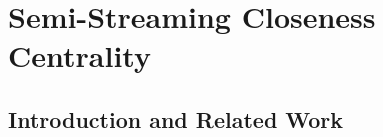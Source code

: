 \documentclass{report}
\begin{document}






\chapter{Semi-Streaming Closeness Centrality} \label{chap:cc}

\section{Introduction and Related Work} \label{cc:sec:intro}


\end{document}
